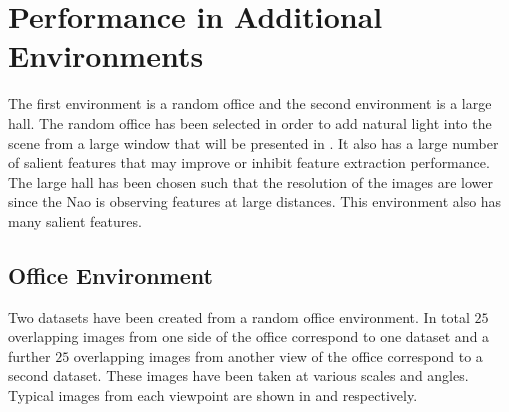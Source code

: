 \documentclass{report}
\begin{document}
%
\section{Performance in Additional Environments}
\label{sec:additionalDataset}
The first environment is a random office and the second environment is a large hall. The random office has been selected in order to add natural light into the scene from a large window that will be presented in . It also has a large number of salient features that may improve or inhibit feature extraction performance. The large hall has been chosen such that the resolution of the images are lower since the Nao is observing features at large distances. This environment also has many salient features. \\

\subsection{Office Environment}
\label{sec:office}
Two datasets have been created from a random office environment. In total $25$ overlapping images from one side of the office correspond to one dataset and a further $25$ overlapping images from another view of the office correspond to a second dataset. These images have been taken at various scales and angles. Typical images from each viewpoint are shown in  and  respectively.\\
\end{document}

